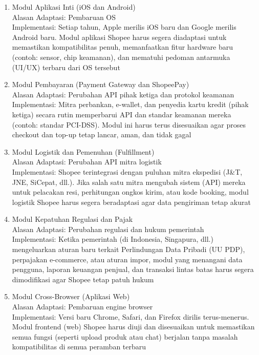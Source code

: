 \begin{enumerate}[leftmargin=*, label=\textbf{\arabic*.}]
            \begin{enumerate}[leftmargin=0.5cm, label=\textbf{\arabic*.}]
                  \item Modul Aplikasi Inti (iOS dan Android)\\
                        Alasan Adaptasi: Pembaruan OS\\
                        Implementasi: Setiap tahun, Apple merilis iOS baru dan Google merilis Android baru. Modul aplikasi Shopee harus segera diadaptasi untuk memastikan kompatibilitas penuh, memanfaatkan fitur hardware baru (contoh: sensor, chip keamanan), dan mematuhi pedoman antarmuka (UI/UX) terbaru dari OS tersebut\\
                  \item Modul Pembayaran (Payment Gateway dan ShopeePay)\\
                        Alasan Adaptasi: Perubahan API pihak ketiga dan protokol keamanan\\
                        Implementasi: Mitra perbankan, e-wallet, dan penyedia kartu kredit (pihak ketiga) secara rutin memperbarui API dan standar keamanan mereka (contoh: standar PCI-DSS). Modul ini harus terus disesuaikan agar proses checkout dan top-up tetap lancar, aman, dan tidak gagal\\
                  \item Modul Logistik dan Pemenuhan (Fulfillment)\\
                        Alasan Adaptasi: Perubahan API mitra logistik\\
                        Implementasi: Shopee terintegrasi dengan puluhan mitra ekspedisi (J\&T, JNE, SiCepat, dll.). Jika salah satu mitra mengubah sistem (API) mereka untuk pelacakan resi, perhitungan ongkos kirim, atau kode booking, modul logistik Shopee harus segera beradaptasi agar data pengiriman tetap akurat\\
                  \item Modul Kepatuhan Regulasi dan Pajak\\
                        Alasan Adaptasi: Perubahan regulasi dan hukum pemerintah\\
                        Implementasi: Ketika pemerintah (di Indonesia, Singapura, dll.) mengeluarkan aturan baru terkait Perlindungan Data Pribadi (UU PDP), perpajakan e-commerce, atau aturan impor, modul yang menangani data pengguna, laporan keuangan penjual, dan transaksi lintas batas harus segera dimodifikasi agar Shopee tetap patuh hukum\\
                  \item Modul Cross-Browser (Aplikasi Web)\\
                        Alasan Adaptasi: Pembaruan engine browser\\
                        Implementasi: Versi baru Chrome, Safari, dan Firefox dirilis terus-menerus. Modul frontend (web) Shopee harus diuji dan disesuaikan untuk memastikan semua fungsi (seperti upload produk atau chat) berjalan tanpa masalah kompatibilitas di semua peramban terbaru
            \end{enumerate}


\end{enumerate}

